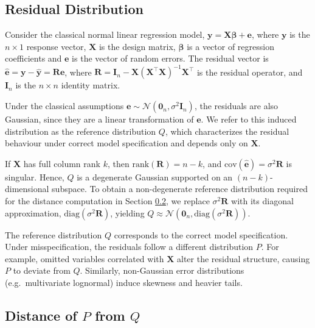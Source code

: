 \documentclass[]{interact}
\theoremstyle{plain}%
\theoremstyle{definition}
\theoremstyle{remark}
\begin{document}
\subsection{Residual Distribution}\label{residual-distribution}

Consider the classical normal linear regression model,
\(\boldsymbol{y}=\boldsymbol{X}\boldsymbol{\beta}+\boldsymbol{e}\),
where \(\boldsymbol{y}\) is the \(n\times 1\) response vector,
\(\boldsymbol{X}\) is the design matrix, \(\boldsymbol{\beta}\) is a
vector of regression coefficients and \(\boldsymbol{e}\) is the vector
of random errors. The residual vector is
\(\hat{\boldsymbol{e}}=\boldsymbol{y}-\hat{\boldsymbol{y}} = \boldsymbol{R}\boldsymbol{e}\),
where
\(\boldsymbol{R}=\boldsymbol{I}_n-\boldsymbol{X}(\boldsymbol{X}^\top\boldsymbol{X})^{-1}\boldsymbol{X}^\top\)
is the residual operator, and \(\boldsymbol{I}_n\) is the \(n\times n\)
identity matrix.

Under the classical assumptions
\(\boldsymbol{e}\sim \mathcal{N}(\boldsymbol{0}_n,\sigma^2\boldsymbol{I}_n)\),
the residuals are also Gaussian, since they are a linear transformation
of \(\boldsymbol{e}\). We refer to this induced distribution as the
reference distribution \(Q\), which characterizes the residual behaviour
under correct model specification and depends only on
\(\boldsymbol{X}\).

If \(\boldsymbol{X}\) has full column rank \(k\), then
\(\text{rank}(\boldsymbol{R}) = n - k\), and
\(\mathrm{cov}(\hat{\boldsymbol{e}})=\sigma^2\boldsymbol{R}\) is
singular. Hence, \(Q\) is a degenerate Gaussian supported on an
\((n-k)\)-dimensional subspace. To obtain a non-degenerate reference
distribution required for the distance computation in Section
\ref{sec-distance-of-p-from-q}, we replace \(\sigma^2\boldsymbol{R}\)
with its diagonal approximation,
\(\mathrm{diag}(\sigma^2\boldsymbol{R})\), yielding
\(Q \approx \mathcal{N}\left(\boldsymbol{0}_n,\mathrm{diag}(\sigma^2\boldsymbol{R})\right)\).

The reference distribution \(Q\) corresponds to the correct model
specification. Under misspecification, the residuals follow a different
distribution \(P\). For example, omitted variables correlated with
\(\boldsymbol{X}\) alter the residual structure, causing \(P\) to
deviate from \(Q\). Similarly, non-Gaussian error distributions
(e.g.~multivariate lognormal) induce skewness and heavier tails.

\subsection{\texorpdfstring{Distance of \(P\) from
\(Q\)}{Distance of P from Q}}\label{sec-distance-of-p-from-q}
\end{document}
